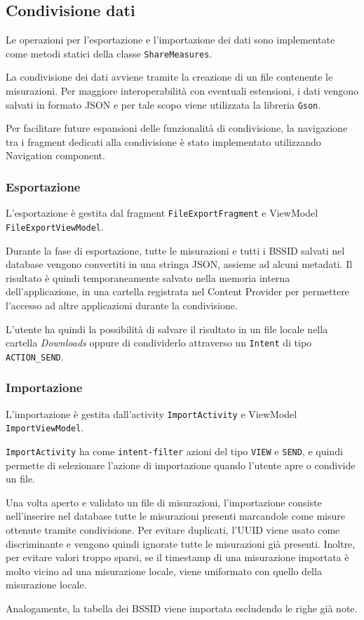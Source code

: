 
\subsection{Condivisione dati}

Le operazioni per l'esportazione e l'importazione dei dati sono implementate come metodi statici della classe \texttt{ShareMeasures}.

La condivisione dei dati avviene tramite la creazione di un file contenente le misurazioni.
Per maggiore interoperabilità con eventuali estensioni, i dati vengono salvati in formato JSON e per tale scopo viene utilizzata la libreria \texttt{Gson}.

Per facilitare future espansioni delle funzionalità di condivisione, la navigazione tra i fragment dedicati alla condivisione è stato implementato utilizzando Navigation component.

\subsubsection{Esportazione}
L'esportazione è gestita dal fragment \texttt{FileExportFragment} e ViewModel \texttt{FileExportViewModel}.

Durante la fase di esportazione, tutte le misurazioni e tutti i BSSID salvati nel database vengono convertiti in una stringa JSON, assieme ad alcuni metadati. Il risultato è quindi temporaneamente salvato nella memoria interna dell'applicazione, in una cartella registrata nel Content Provider per permettere l'accesso ad altre applicazioni durante la condivisione.

L'utente ha quindi la possibilità di salvare il risultato in un file locale nella cartella \textit{Downloads} oppure di condividerlo attraverso un \texttt{Intent} di tipo \texttt{ACTION\_SEND}.



\subsubsection{Importazione}
L'importazione è gestita dall'activity \texttt{ImportActivity} e ViewModel \texttt{ImportViewModel}.

\texttt{ImportActivity} ha come \texttt{intent-filter} azioni del tipo \texttt{VIEW} e \texttt{SEND}, e quindi permette di selezionare l'azione di importazione quando l'utente apre o condivide un file.

Una volta aperto e validato un file di misurazioni, l'importazione consiste nell'inserire nel database tutte le misurazioni presenti marcandole come misure ottenute tramite condivisione. Per evitare duplicati, l'UUID viene usato come discriminante e vengono quindi ignorate tutte le misurazioni già presenti.
Inoltre, per evitare valori troppo sparsi, se il timestamp di una misurazione importata è molto vicino ad una misurazione locale, viene uniformato con quello della misurazione locale.

Analogamente, la tabella dei BSSID viene importata escludendo le righe già note.